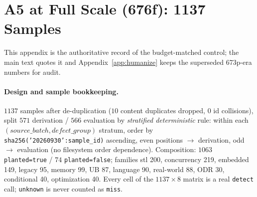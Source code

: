\section{A5 at Full Scale (676f): 1137 Samples}
\label{app:a5full}
This appendix is the authoritative record of the budget-matched control; the main text quotes it and
Appendix~\ref{app:humanize} keeps the superseded 673p-era numbers for audit.

\paragraph{Design and sample bookkeeping.}
$1137$ samples after de-duplication ($10$ content duplicates dropped, $0$ id collisions), split
$571$ derivation / $566$ evaluation by \emph{stratified deterministic} rule: within each
$(source\_batch, defect\_group)$ stratum, order by \texttt{sha256('20260930':sample\_id)} ascending,
even positions $\to$ derivation, odd $\to$ evaluation (no filesystem order dependence).
Composition: $1063$ \texttt{planted=true} / $74$ \texttt{planted=false}; families
stl 200, concurrency 219, embedded 149, legacy 95, memory 99, UB 87, language 90, real-world 88,
ODR 30, conditional 40, optimization 40. Every cell of the $1137\times8$ matrix is a real
\texttt{detect} call; \texttt{unknown} is never counted as \texttt{miss}.

